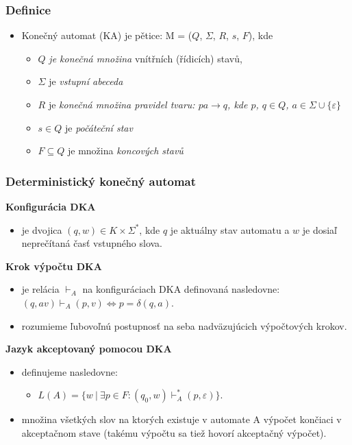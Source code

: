 \documentclass{beamer}
\begin{document}
\begin{frame}
\frametitle{Definice}
\begin{itemize}
\item Konečný automat (KA) je pětice: M = ($Q$, $\Sigma$, $R$, $s$, $F$), kde 
\begin{itemize}

\item $Q$ \textit{je konečná množina} vnítřních (řídicích) stavů,
\item{$\Sigma$ je \textit{vstupní abeceda}}
\item $R$ je \textit{konečná množina pravidel tvaru: $pa \rightarrow q$, kde $p$, $q \in Q$, $a \in \Sigma \cup \{\varepsilon\} $}
\item $s \in Q$ je \textit{počáteční stav}
\item $F \subseteq Q$ je množina \textit{koncových stavů}
\end{itemize}



\end{itemize}
\end{frame}
\begin{frame}
\frametitle{Deterministický konečný automat}

\textbf{Konfigurácia DKA}
\begin{itemize}
\item{je dvojica $(q,w) \in K \times \Sigma^*$, kde $q$ je aktuálny stav automatu a $w$ je dosiaľ neprečítaná časť vstupného slova. }
\end{itemize}
\textbf{Krok výpočtu DKA}
\begin{itemize}
\item je relácia $\vdash _{A} $ na konfiguráciach DKA definovaná nasledovne:$(q,av)\vdash _{A}(p,v)\iff p=\delta (q,a).$
\item rozumieme ľubovoľnú postupnosť na seba nadväzujúcich výpočtových krokov.
\end{itemize}

\textbf{Jazyk akceptovaný pomocou DKA}
\begin{itemize}
\item definujeme nasledovne:
\begin{itemize}
\item $L(A)=\{w\ |\ \exists p\in F:(q_{0},w)\vdash _{A}^{\ast }(p,\varepsilon )\}.$
\end{itemize}

\item  množina všetkých slov
 na ktorých existuje v automate A výpočet končiaci v akceptačnom stave (takému výpočtu sa tiež hovorí akceptačný výpočet).
\end{itemize}
\end{frame}
\end{document}
